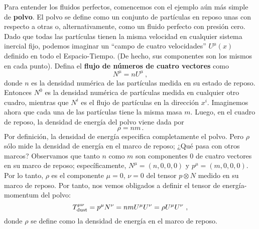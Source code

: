 \documentclass[11pt,b5paper,openany,twoside]{book}
\newcommand{\mn}{{\mu\nu}}
\begin{document}
Para entender los fluidos perfectos, comencemos con el ejemplo aún más simple de {\bf polvo}.
El polvo se define como un conjunto de partículas en reposo unas con respecto a otras o, alternativamente, como un fluido perfecto con presión cero.
Dado que todas las partículas tienen la misma velocidad en cualquier sistema inercial fijo, podemos imaginar un ``campo de cuatro velocidades'' $U^\mu(x)$ definido en todo el Espacio-Tiempo.
(De hecho, sus componentes son los mismos en cada punto).
Defina el {\bf flujo de números de cuatro vectores} como
\begin{equation}
N^\mu = n U^\mu\ ,\label{1.104}
\end{equation}
donde $n$ es la densidad numérica de las partículas medida en su estado de reposo.
Entonces $N^0$ es la densidad numérica de partículas medida en cualquier otro cuadro, mientras que $N^i$ es el flujo de partículas en la dirección $x^i$.
Imaginemos ahora que cada una de las partículas tiene la misma masa $m$.
Luego, en el cuadro de reposo, la densidad de energía del polvo viene dada por
\begin{equation}
\rho = nm\,.\label{1.105}
\end{equation}
Por definición, la densidad de energía especifica completamente el polvo.
Pero $\rho$ sólo mide la densidad de energía en el marco de reposo; ¿Qué pasa con otros marcos? Observamos que tanto $n$ como $m$ son componentes $0$ de cuatro vectores en su marco de reposo; específicamente, $N^\mu = (n,0,0,0)$ y $p^\mu = (m,0,0,0)$.
Por lo tanto, $\rho$ es el componente $\mu = 0$, $\nu =0$ del tensor $p\otimes N$ medido en su marco de reposo.
Por tanto, nos vemos obligados a definir el tensor de energía-momentum del polvo:
\begin{equation}
T^\mn_{\rm dust} = p^\mu N^\nu = nm U^\mu U^\nu = \rho U^\mu U^\nu
\ ,\label{1.106}
\end{equation}
donde $\rho$ se define como la densidad de energía en el marco de reposo.
\end{document}
